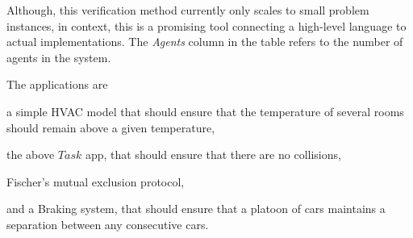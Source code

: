  Although, this verification method currently only scales to small problem instances, in context, this is a promising tool connecting a high-level language to actual implementations. The \emph{Agents} column in the table refers to the number of agents in the system. 
 
 The applications are 
\begin{inparaenum}[(i)]
\item a simple HVAC model that should ensure that the temperature of several rooms should remain above a  given temperature, 
\item  the above $\mathit{Task}$ app, that should ensure that there are no collisions, 
\item Fischer's mutual exclusion protocol, 
\item and a Braking system, that should ensure that a platoon of cars maintains a separation between any consecutive cars. 
\end{inparaenum}

